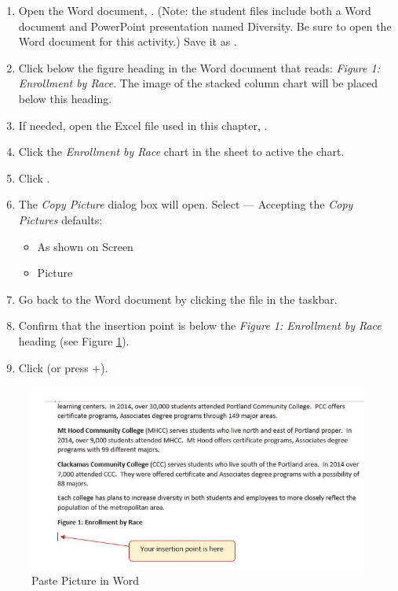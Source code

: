 \begin{enumerate}
	\item Open the Word document, . (Note: the student files include both a Word document and PowerPoint presentation named Diversity. Be sure to open the Word document for this activity.) Save it as .
	\item Click below the figure heading in the Word document that reads: \textit{Figure 1: Enrollment by Race}. The image of the stacked column chart will be placed below this heading.
	\item If needed, open the Excel file used in this chapter,  . 
	\item Click the \textit{Enrollment by Race} chart in the  sheet to active the chart.
	\item Click .
	\item The \textit{Copy Picture} dialog box will open. Select  --- Accepting the \textit{Copy Pictures} defaults:
	
	\begin{itemize}
		\item As shown on Screen
		\item Picture
	\end{itemize}	

	\item Go back to the  Word document by clicking the file in the taskbar.
	\item Confirm that the insertion point is below the \textit{Figure 1: Enrollment by Race} heading (see Figure \ref{04:fig46}).
	\item Click  (or press +).
\end{enumerate}

\begin{figure}[H]
	\centering
	\includegraphics[width=\maxwidth{.95\linewidth}]{gfx/ch04_fig46}
	\caption{Paste Picture in Word}
	\label{04:fig46}
\end{figure}

